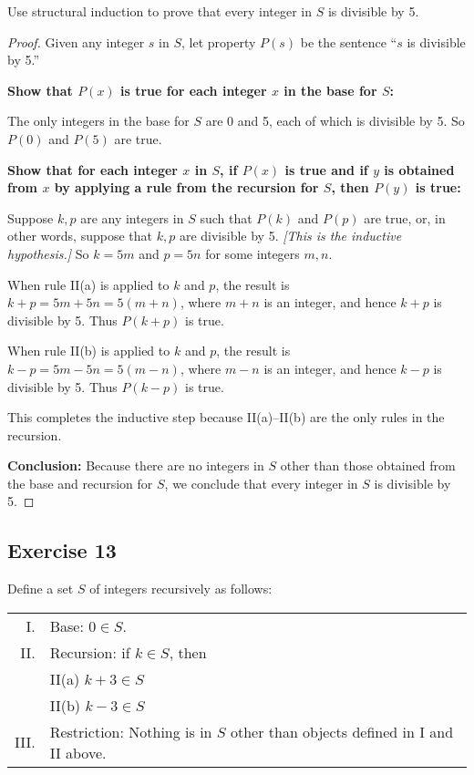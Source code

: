 \documentclass[14pt]{extarticle}
\begin{document}
Use structural induction to prove that every integer in $S$ is divisible by 5.

\begin{proof}
    Given any integer $s$ in $S$, let property $P(s)$ be the sentence “$s$ is divisible by 5.”

    {\bf Show that $P(x)$ is true for each integer $x$ in the base for $S$:}

    The only integers in the base for $S$ are 0 and 5, each of which is divisible by 5. So $P(0)$ and $P(5)$ are true.

        {\bf Show that for each integer $x$ in $S$, if $P(x)$ is true and if $y$ is obtained from $x$ by applying a rule
            from the recursion for $S$, then $P(y)$ is true:}

    Suppose $k, p$ are any integers in $S$ such that $P(k)$ and $P(p)$ are true, or, in other words, suppose that $k, p$
    are divisible by 5. {\it [This is the inductive hypothesis.]} So $k = 5m$ and $p = 5n$ for some integers $m, n$.

    When rule II(a) is applied to $k$ and $p$, the result is $k+p = 5m+5n = 5(m+n)$, where $m+n$ is an integer, and
    hence $k+p$ is divisible by 5. Thus $P(k+p)$ is true.

    When rule II(b) is applied to $k$ and $p$, the result is $k-p = 5m-5n = 5(m-n)$, where $m-n$ is an integer, and
    hence $k-p$ is divisible by 5. Thus $P(k-p)$ is true.

    This completes the inductive step because II(a)–II(b) are the only rules in the recursion.

        {\bf Conclusion:} Because there are no integers in $S$ other than those obtained from the base and recursion for
    $S$, we conclude that every integer in $S$ is divisible by 5.
\end{proof}

\subsection{Exercise 13}
Define a set $S$ of integers recursively as follows:

\begin{tabular}{rl}
    I.   & Base: $0 \in S$.                                                             \\
    II.  & Recursion: if $k \in S$, then                                                \\
         & II(a) $k+3 \in S$                                                            \\
         & II(b) $k-3 \in S$                                                            \\
    III. & Restriction: Nothing is in $S$ other than objects defined in I and II above.
\end{tabular}
\end{document}
